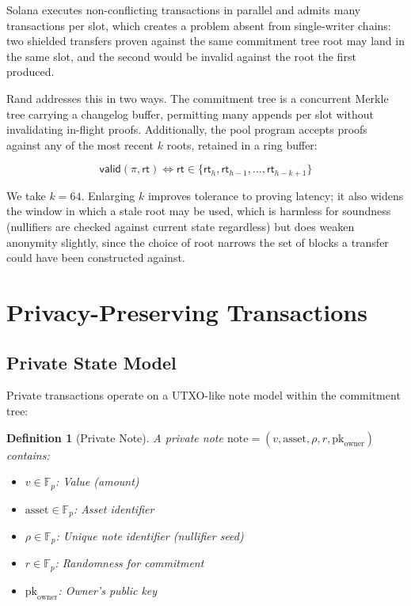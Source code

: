 \documentclass[11pt,a4paper]{article}
\newtheorem{definition}[theorem]{Definition}
\begin{document}
Solana executes non-conflicting transactions in parallel and admits many transactions per slot, which creates a problem absent from single-writer chains: two shielded transfers proven against the same commitment tree root may land in the same slot, and the second would be invalid against the root the first produced.

Rand addresses this in two ways. The commitment tree is a concurrent Merkle tree carrying a changelog buffer, permitting many appends per slot without invalidating in-flight proofs. Additionally, the pool program accepts proofs against any of the most recent $k$ roots, retained in a ring buffer:

\begin{equation}
\mathsf{valid}(\pi, \mathsf{rt}) \iff \mathsf{rt} \in \{\mathsf{rt}_{h}, \mathsf{rt}_{h-1}, \ldots, \mathsf{rt}_{h-k+1}\}
\end{equation}

We take $k = 64$. Enlarging $k$ improves tolerance to proving latency; it also widens the window in which a stale root may be used, which is harmless for soundness (nullifiers are checked against current state regardless) but does weaken anonymity slightly, since the choice of root narrows the set of blocks a transfer could have been constructed against.

\section{Privacy-Preserving Transactions}
\label{sec:privacy}

\subsection{Private State Model}

Private transactions operate on a UTXO-like note model within the commitment tree:

\begin{definition}[Private Note]
A private note $\text{note} = (v, \text{asset}, \rho, r, \text{pk}_{\text{owner}})$ contains:
\begin{itemize}
    \item $v \in \mathbb{F}_p$: Value (amount)
    \item $\text{asset} \in \mathbb{F}_p$: Asset identifier
    \item $\rho \in \mathbb{F}_p$: Unique note identifier (nullifier seed)
    \item $r \in \mathbb{F}_p$: Randomness for commitment
    \item $\text{pk}_{\text{owner}}$: Owner's public key
\end{itemize}
\end{definition}
\end{document}
